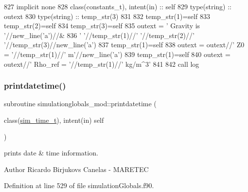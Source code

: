 \begin{DoxyCode}
827     \textcolor{keywordtype}{implicit none}
828     \textcolor{keywordtype}{class}(constants\_t), \textcolor{keywordtype}{intent(in)} :: self
829     \textcolor{keywordtype}{type}(string) :: outext
830     \textcolor{keywordtype}{type}(string) :: temp\_str(3)
831 
832     temp\_str(1)=self%
833     temp\_str(2)=self%
834     temp\_str(3)=self%
835     outext = \textcolor{stringliteral}{'      Gravity is '}//new\_line(\textcolor{stringliteral}{'a'})//&
836         \textcolor{stringliteral}{'       '}//temp\_str(1)//\textcolor{stringliteral}{' '}//temp\_str(2)//\textcolor{stringliteral}{' '}//temp\_str(3)//new\_line(\textcolor{stringliteral}{'a'})
837     temp\_str(1)=self%
838     outext = outext//\textcolor{stringliteral}{'       Z0 = '}//temp\_str(1)//\textcolor{stringliteral}{' m'}//new\_line(\textcolor{stringliteral}{'a'})
839     temp\_str(1)=self%
840     outext = outext//\textcolor{stringliteral}{'       Rho\_ref = '}//temp\_str(1)//\textcolor{stringliteral}{' kg/m^3'}
841 
842     \textcolor{keyword}{call }log%
\end{DoxyCode}
\mbox{\label{namespacesimulationglobals__mod_abd0e28a5ec7733d0292dd8e631e96577}} 
\subsubsection{\texorpdfstring{printdatetime()}{printdatetime()}}
{\footnotesize\ttfamily subroutine simulationglobals\+\_\+mod\+::printdatetime (\begin{DoxyParamCaption}\item[{class(\mbox{\hyperlink{structsimulationglobals__mod_1_1sim__time__t}{sim\+\_\+time\+\_\+t}}), intent(in)}]{self }\end{DoxyParamCaption})\hspace{0.3cm}{\ttfamily [private]}}



prints date \& time information. 

\begin{DoxyAuthor}{Author}
Ricardo Birjukovs Canelas -\/ M\+A\+R\+E\+T\+EC 
\end{DoxyAuthor}


Definition at line 529 of file simulation\+Globals.\+f90.


